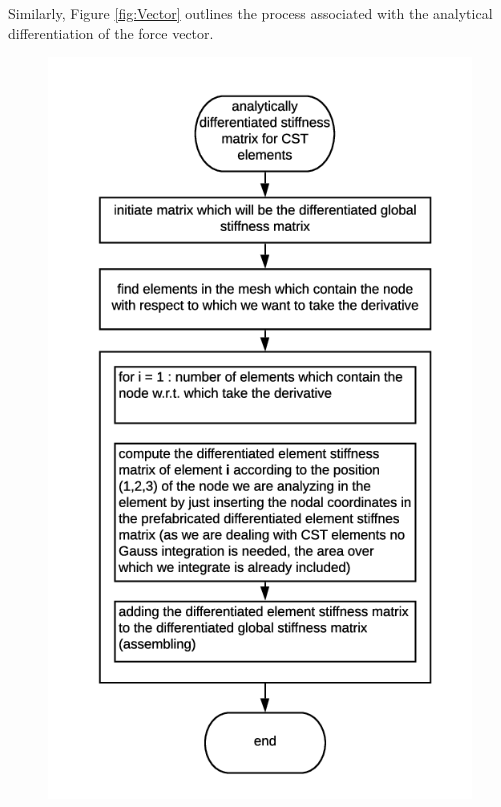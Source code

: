 Similarly, Figure \ref{fig:Vector} outlines the process associated with the analytical differentiation of the force vector.\\[3pt]
\begin{figure}[ht]
\centering
\begin{minipage}{.5\textwidth}
  \centering
  \includegraphics[width=1.06\linewidth]{images/matrixdifferentiation.png}
  \label{fig:Matrix}
\end{minipage}%

\end{figure}
